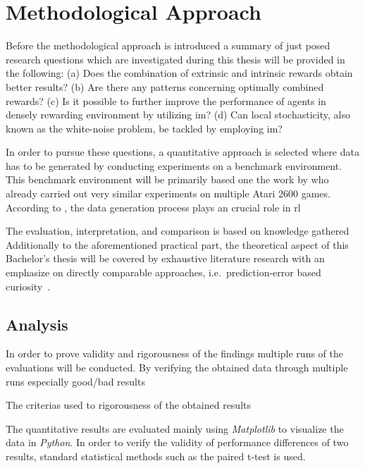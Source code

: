 \documentclass[draft,final]{vutinfth} %
\begin{document}
    \section{Methodological Approach}\label{sec:methodological-approach}

    Before the methodological approach is introduced a summary of just posed research questions which are investigated during this thesis will be provided in the following: (a) Does the combination of extrinsic and intrinsic rewards obtain better results? (b) Are there any patterns concerning optimally combined rewards? (c) Is it possible to further improve the performance of agents in densely rewarding environment by utilizing \gls{im}? (d) Can local stochasticity, also known as the white-noise problem, be tackled by employing \gls{im}?

    In order to pursue these questions, a quantitative approach is selected where data has to be generated by conducting experiments on a benchmark environment.
    This benchmark environment will be primarily based one the work by \citet{burda_large-scale_2018-1} who already carried out very similar experiments on multiple Atari 2600 games.
    According to \citeauthor{francois-lavet_introduction_2018}, the data generation process plays an crucial role in \gls{rl}

    The evaluation, interpretation, and comparison is based on knowledge gathered
    Additionally to the aforementioned practical part, the theoretical aspect of this Bachelor's thesis will be covered by exhaustive literature research with an emphasize on directly comparable approaches, i.e.\ prediction-error based curiosity~\citep{burda_large-scale_2018-1}.

    \subsection{Analysis}
    In order to prove validity and rigorousness of the findings multiple runs of the evaluations will be conducted.
    By verifying the obtained data through multiple runs especially good/bad results

    The criterias used to rigorousness of the obtained results

    The quantitative results are evaluated mainly using \textit{Matplotlib} to visualize the data in \textit{Python}.
    In order to verify the validity of performance differences of two results, standard statistical methods such as the paired t-test is used.
\end{document}
